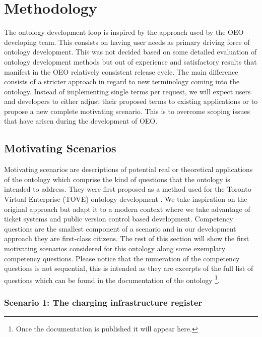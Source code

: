 ﻿\section{Methodology}
\label{methodology}

The ontology development loop is inspired by the approach used by the OEO
developing team. This consists on having user needs as primary driving force of
ontology development. This was not decided based on some detailed evaluation of
ontology development methods but out of experience and satisfactory results
that manifest in the OEO relatively consistent release cycle. The main
difference consists of a stricter approach in regard to new terminology coming
into the ontology. Instead of implementing single terms per request, we will
expect users and developers to either adjust their proposed terms to existing
applications or to propose a new complete motivating scenario. This is to
overcome scoping issues that have arisen during the development of OEO. 


\subsection{Motivating Scenarios}

Motivating scenarios are descriptions of potential real or theoretical
applications of the ontology which comprise the kind of questions that the
ontology is intended to address.  They were first proposed as a method used for
the Toronto Virtual Enterprise (TOVE) ontology development
\cite{Gruninger.1995}. We take inspiration on the original approach but adapt
it to a modern context where we take advantage of ticket systems and public
version control based development. Competency questions are the smallest
component of a scenario and in our development approach they are first-class
citizens. The rest of this section will show the first motivating scenarios
considered for this ontology along some exemplary competency questions. Please
notice that the numeration of the competency questions is not sequential, this
is intended as they are excerpts of the full list of questions which can be
found in the documentation of the ontology \footnote{Once the documentation is
published it will appear here.}.

\subsubsection*{Scenario 1: The charging infrastructure register}

